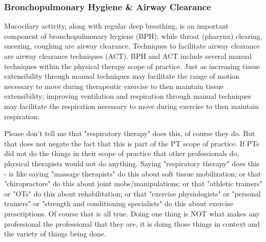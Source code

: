 \subsubsection{Bronchopulmonary Hygiene \& Airway Clearance}
Mucocilary activity, along with regular deep breathing, is an important component of bronchopulmonary hygiene (BPH); while throat (pharynx) clearing, sneezing, coughing are airway clearance. Techniques to facilitate airway clearance are airway clearance techniques (ACT). BPH and ACT include several manual techniques within the physical therapy scope of practice. Just as increasing tissue extensibility through manual techniques may facilitate the range of motion necessary to move during therapeutic exercise to then maintain tissue extensibility; improving ventilation and respiration through manual techniques may facilitate the respiration necessary to move during exercise to then maintain respiration.

\begin{svgraybox}
    Please don't tell me that "respiratory therapy" does this, of course they do. But that does not negate the fact that this is part of the PT scope of practice. If PTs did not do the things in their scope of practice that other professionals do, physical therapists would not do anything. Saying "respiratory therapy" does this - is like saying "massage therapists" do this about soft tissue mobilization; or that "chiropractors" do this about joint mobs/manipulations; or that "athletic trainers" or "OTs" do this about rehabilitation; or that "exercise physiologists" or "personal trainers" or "strength and conditioning specialists" do this about exercise prescriptions. Of course that is all true. Doing one thing is NOT what makes any professional the professional that they are, it is doing those things in context and the variety of things being done.
\end{svgraybox}
  

